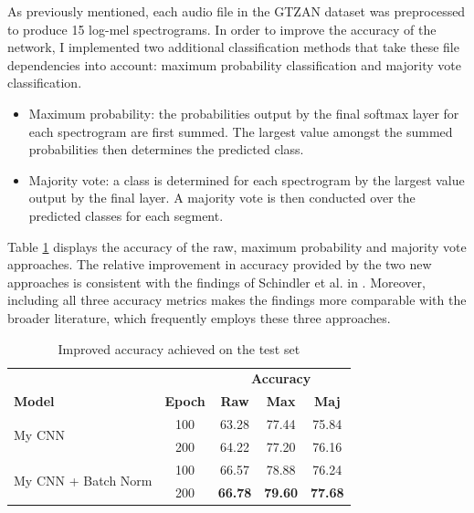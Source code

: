 \documentclass[conference]{IEEEtran}
\begin{document}
As previously mentioned, each audio file in the GTZAN \cite{TzanetakisCook} dataset was preprocessed to produce 15 log-mel spectrograms.
In order to improve the accuracy of the network, I implemented two additional classification methods that take these file dependencies into account: maximum probability classification and majority vote classification.
\begin{itemize}
    \item Maximum probability: the probabilities output by the final softmax layer for each spectrogram are first summed. The largest value amongst the summed probabilities then determines the predicted class.
    \item Majority vote: a class is determined for each spectrogram by the largest value output by the final layer. A majority vote is then conducted over the predicted classes for each segment.
\end{itemize}

Table \ref{improved_results} displays the accuracy of the raw, maximum probability and majority vote approaches.
The relative improvement in accuracy provided by the two new approaches is consistent with the findings of Schindler et al. in \cite{SchindlerLidyRauber}.
Moreover, including all three accuracy metrics makes the findings more comparable with the broader literature, which frequently employs these three approaches.

\begin{table}[htbp]
    \caption{Improved accuracy achieved on the test set}
    \begin{center}
    \begin{tabular}{l c c c c}
    \toprule
    &&\multicolumn{3}{c}{\textbf{Accuracy}}\\
    \cmidrule(lr){3-5}
    \textbf{Model}&\textbf{Epoch}&\textbf{Raw}&\textbf{Max}&\textbf{Maj}\\
    \midrule
    \multirow{ 2}{*}{My CNN} & 100 & 63.28 & 77.44 & 75.84 \\
    & 200 & 64.22 & 77.20 & 76.16 \\
    \midrule
    \multirow{ 2}{*}{My CNN + Batch Norm} & 100 & 66.57 & 78.88 & 76.24 \\
    & 200 & \textbf{66.78} & \textbf{79.60} & \textbf{77.68} \\
    \bottomrule
    \end{tabular}
    \label{improved_results}
    \end{center}
\end{table}
\end{document}
